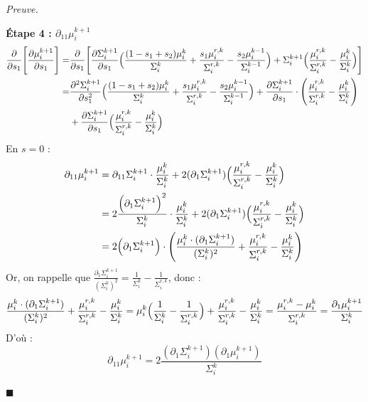 \documentclass[12pt]{article}
\renewcommand{\qedsymbol}{$\blacksquare$}
\renewenvironment{proof}[1][\proofname]{%
  \par\medskip\noindent
  \textit{\color{proofgray}#1.}\enspace\ignorespaces
}{\hfill\qedsymbol\par\medskip}
\renewcommand{\proofname}{Preuve}
\begin{document}
\begin{proof}
\medskip
\textbf{Étape 4 : $\partial_{11}\mu_i^{k+1}$}
\begin{equation*}
\begin{aligned}
\frac{\partial}{\partial s_1}\Biggl[
    \frac{\partial \mu_i^{k+1}}{\partial s_1}
\Biggr] 
=& \frac{\partial}{\partial s_1}\Biggl[ 
\frac{\partial \Sigma_i^{k+1}}{\partial s_1} \Bigl( 
    \frac{(1-s_1+s_2)\mu_i^k}{\Sigma_i^{k}} + \frac{s_1\mu_i^{r,k}}{\Sigma_i^{r,k}} - \frac{s_2\mu_i^{k-1}}{\Sigma_i^{k-1}} \Bigr) 
    + \Sigma_i^{k+1} \Bigl( 
        \frac{\mu_i^{r,k}}{\Sigma_i^{r,k}} - \frac{\mu_i^{k}}{\Sigma_i^{k}}
    \Bigr)
\Biggr]\\
=& \frac{\partial^2 \Sigma_i^{k+1}}{\partial s_1^2 }  \Bigl( 
    \frac{(1-s_1+s_2)\mu_i^k}{\Sigma_i^{k}} + \frac{s_1\mu_i^{r,k}}{\Sigma_i^{r,k}} - \frac{s_2\mu_i^{k-1}}{\Sigma_i^{k-1}} \Bigr) 
    + \frac{\partial \Sigma_i^{k+1}}{\partial s_1} \cdot \Biggl(
        \frac{\mu_i^{r,k}}{\Sigma_i^{r,k}} - \frac{\mu_i^{k}}{\Sigma_i^{k}}
    \Biggr)\\
    &+ \frac{\partial \Sigma_i^{k+1}}{\partial s_1}  \Bigl( 
        \frac{\mu_i^{r,k}}{\Sigma_i^{r,k}} - \frac{\mu_i^{k}}{\Sigma_i^{k}}
    \Bigr)
\end{aligned}
\end{equation*}
En $s=0$ :
\begin{equation*}
    \begin{aligned}
\partial_{11} \mu_i^{k+1} &= \partial_{11} \Sigma_i^{k+1} \cdot \frac{\mu_i^k}{\Sigma_i^k} + 2(\partial_1 \Sigma_i^{k+1}) \Bigl(
    \frac{\mu_i^{r,k}}{\Sigma_i^{r,k}} -  \frac{\mu_i^{k}}{\Sigma_i^{k}}
\Bigr)\\
&=2 \frac{\Bigl(\partial_1 \Sigma_i^{k+1}\Bigr)^2}{\Sigma_i^k} \cdot \frac{\mu_i^k}{\Sigma_i^k} +  2(\partial_1 \Sigma_i^{k+1}) \Bigl(
    \frac{\mu_i^{r,k}}{\Sigma_i^{r,k}} -  \frac{\mu_i^{k}}{\Sigma_i^{k}}
    \Bigr)
    \\
    &=2\Bigl(\partial_1 \Sigma_i^{k+1}\Bigr)\cdot \Biggl(
    \frac{\mu_i^k \cdot (\partial_1 \Sigma_i^{k+1})}{(\Sigma_i^{k})^2} + \frac{\mu_i^{r,k}}{\Sigma_i^{r,k}} - \frac{\mu_i^k}{\Sigma_i^k}
    \Biggr)
    \end{aligned}
\end{equation*}
Or, on rappelle que $\frac{\partial_1 \Sigma_i^{k+1}}{(\Sigma_i^k)^2} =  \frac{1}{\Sigma_i^k} - \frac{1}{\Sigma_i^{r,k}}$, donc :
\begin{equation*}
\frac{\mu_i^k \cdot (\partial_1 \Sigma_i^{k+1})}{(\Sigma_i^{k})^2} + \frac{\mu_i^{r,k}}{\Sigma_i^{r,k}} - \frac{\mu_i^k}{\Sigma_i^k} = \mu_i^k\Bigl(\frac{1}{\Sigma_i^k} - \frac{1}{\Sigma_i^{r,k}}\Bigr) + \frac{\mu_i^{r,k}}{\Sigma_i^{r,k}} - \frac{\mu_i^k}{\Sigma_i^k} = \frac{\mu_i^{r,k} - \mu_i^k}{\Sigma_i^{r,k}} = \frac{\partial_1\mu_i^{k+1}}{\Sigma_i^k}
\end{equation*}
D'où :
\begin{equation*}
\partial_{11} \mu_i^{k+1} = 2 \frac{(\partial_1 \Sigma_i^{k+1})(\partial_1 \mu_i^{k+1})}{\Sigma_i^k}
\end{equation*}


\end{proof}
\end{document}
